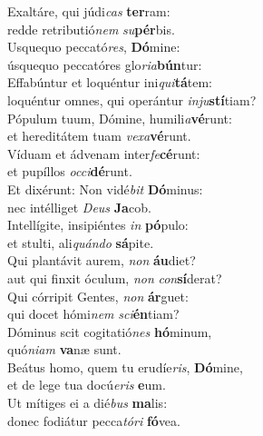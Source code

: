 \evenverse Exaltáre, qui júdi\textit{cas} \textbf{ter}ram:~\*\\
\evenverse redde retributió\textit{nem} \textit{su}\textbf{pér}bis.\\
\oddverse Usquequo peccató\textit{res}, \textbf{Dó}mine:~\*\\
\oddverse úsquequo peccatóres glo\textit{ri}\textit{a}\textbf{bún}tur:\\
\evenverse Effabúntur et loquéntur ini\textit{qui}\textbf{tá}tem:~\*\\
\evenverse loquéntur omnes, qui operántur \textit{in}\textit{ju}\textbf{stí}tiam?\\
\oddverse Pópulum tuum, Dómine, humili\textit{a}\textbf{vé}runt:~\*\\
\oddverse et hereditátem tuam \textit{ve}\textit{xa}\textbf{vé}runt.\\
\evenverse Víduam et ádvenam inter\textit{fe}\textbf{cé}runt:~\*\\
\evenverse et pupíllos \textit{oc}\textit{ci}\textbf{dé}runt.\\
\oddverse Et dixérunt: Non vidé\textit{bit} \textbf{Dó}minus:~\*\\
\oddverse nec intélliget \textit{De}\textit{us} \textbf{Ja}cob.\\
\evenverse Intellígite, insipiéntes \textit{in} \textbf{pó}pulo:~\*\\
\evenverse et stulti, ali\textit{quán}\textit{do} \textbf{sá}pite.\\
\oddverse Qui plantávit aurem, \textit{non} \textbf{áu}diet?~\*\\
\oddverse aut qui finxit óculum, \textit{non} \textit{con}\textbf{sí}derat?\\
\evenverse Qui córripit Gentes, \textit{non} \textbf{ár}guet:~\*\\
\evenverse qui docet hómi\textit{nem} \textit{sci}\textbf{én}tiam?\\
\oddverse Dóminus scit cogitatió\textit{nes} \textbf{hó}minum,~\*\\
\oddverse quó\textit{ni}\textit{am} \textbf{va}næ sunt.\\
\evenverse Beátus homo, quem tu erudíe\textit{ris}, \textbf{Dó}mine,~\*\\
\evenverse et de lege tua docú\textit{e}\textit{ris} \textbf{e}um.\\
\oddverse Ut mítiges ei a dié\textit{bus} \textbf{ma}lis:~\*\\
\oddverse donec fodiátur pecca\textit{tó}\textit{ri} \textbf{fó}vea.\\
